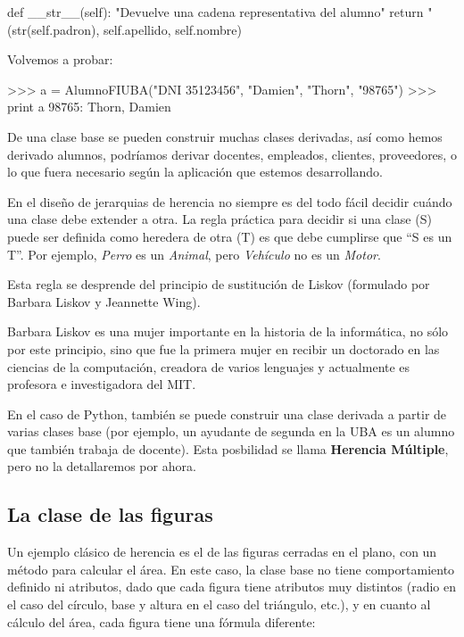 \begin{codigo-python-sn}
    def __str__(self):
        "Devuelve una cadena representativa del alumno"
        return "%
            (str(self.padron), self.apellido, self.nombre)
\end{codigo-python-sn}

Volvemos a probar:

\begin{codigo-python-sn}
>>> a = AlumnoFIUBA("DNI 35123456", "Damien", "Thorn", "98765")
>>> print a
98765: Thorn, Damien
\end{codigo-python-sn}

De una clase base se pueden construir muchas clases derivadas, así como
hemos derivado alumnos, podríamos derivar docentes, empleados, clientes,
proveedores, o lo que fuera necesario según la aplicación que estemos
desarrollando.

\begin{sabias_que}
En el diseño de jerarquias de herencia no siempre es del todo fácil decidir
cuándo una clase debe extender a otra.
La regla práctica para decidir si una clase (S) puede ser
definida como heredera de otra (T) es que debe cumplirse que ``S es un T''.
Por ejemplo, {\it Perro} es un {\it Animal}, pero {\it Vehículo} no es un {\it
Motor}.

Esta regla se desprende del principio de sustitución de Liskov (formulado por
Barbara Liskov y Jeannette Wing).

Barbara Liskov es una mujer importante en la historia de la informática, no
sólo por este principio, sino que fue la primera mujer en recibir un doctorado
en las ciencias de la computación, creadora de varios lenguajes y actualmente
es profesora e investigadora del MIT.
\end{sabias_que}

En el caso de Python, también se puede construir una clase derivada a partir de
varias clases base (por ejemplo, un ayudante de segunda en la UBA es un alumno
que también trabaja de docente).  Esta posbilidad se llama {\bf Herencia
Múltiple}, pero no la detallaremos por ahora.

\subsection*{La clase de las figuras}

Un ejemplo clásico de herencia es el de las figuras cerradas en el plano, con un
método para calcular el área. En este caso, la clase base no tiene comportamiento definido
ni atributos, dado que cada figura tiene atributos muy distintos (radio en el caso
del círculo, base y altura en el caso del triángulo, etc.), y en cuanto al cálculo
del área, cada figura tiene una fórmula diferente:


